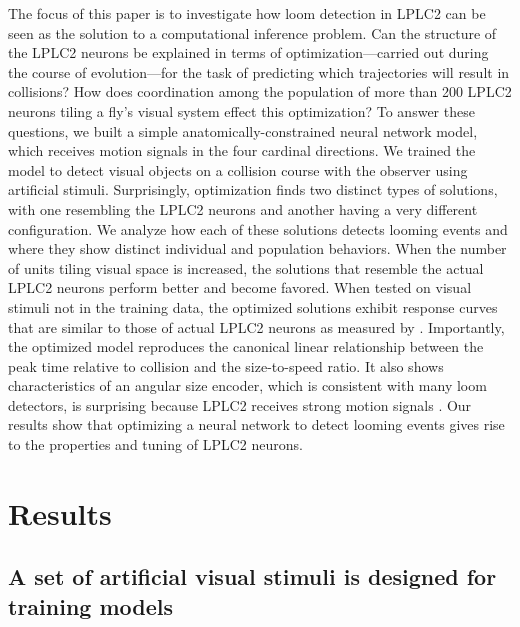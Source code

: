 \documentclass[pdftex,9pt,lineno]{elife}
\begin{document}
The focus of this paper is to investigate how loom detection in LPLC2 can be seen as the solution to a computational inference problem. Can the structure of the LPLC2 neurons be explained in terms of optimization---carried out during the course of evolution---for the task of predicting which trajectories will result in collisions?
How does coordination among the population of more than 200 LPLC2 neurons tiling a fly's visual system effect this optimization?  To answer these questions, we built a simple anatomically-constrained neural network model, which receives motion signals in the four cardinal directions. We trained the model to detect visual objects on a collision course with the observer using artificial stimuli. Surprisingly, optimization finds two distinct types of solutions, with one resembling the LPLC2 neurons and another having a very different configuration. We analyze how each of these solutions detects looming events and where they show distinct individual and population behaviors.
When the number of units tiling visual space is increased, the solutions that resemble the actual LPLC2 neurons perform better and become favored. When tested on visual stimuli not in the training data, the optimized solutions exhibit response curves that are similar to those of actual LPLC2 neurons as measured by \cite{klapoetke2017ultra}. Importantly, the optimized model reproduces the canonical linear relationship between the peak time relative to collision and the size-to-speed ratio. It also shows characteristics of an angular size encoder, which is consistent with many loom detectors, is surprising because LPLC2 receives strong motion signals \citep{gabbiani1999computation,von2017feature,ache2019neural}. Our results show that optimizing a neural network to detect looming events gives rise to the properties and tuning of LPLC2 neurons.

\section{Results}

\subsection{A set of artificial visual stimuli is designed for training models}
\end{document}
